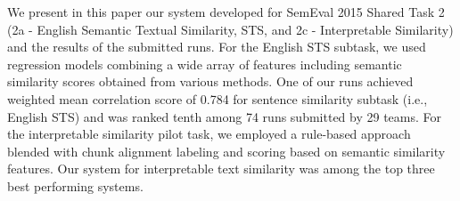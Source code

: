 We present in this paper our system developed for SemEval 2015 Shared Task 2 (2a - English Semantic Textual Similarity, STS, and 2c - Interpretable Similarity) and the results of the submitted runs. For the English STS subtask, we used regression models combining a wide array of features including semantic similarity scores obtained from various methods. One of our runs achieved weighted mean correlation score of 0.784 for sentence similarity subtask (i.e., English STS) and was ranked tenth among 74 runs submitted by 29 teams. For the interpretable similarity pilot task, we employed a rule-based approach blended with chunk alignment labeling and scoring based on semantic similarity features. Our system for interpretable text similarity was among the top three best performing systems.

